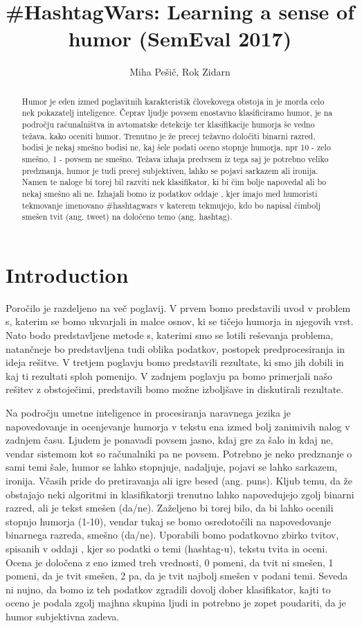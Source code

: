 \documentclass[a4paper]{article}
\title{\#HashtagWars: Learning a sense of humor (SemEval 2017)}
\author{Miha Pešič, Rok Zidarn}
\begin{document}
\maketitle

\begin{abstract}
Humor je eden izmed poglavitnih karakteristik človekovega obstoja in je morda celo nek pokazatelj inteligence. Čeprav ljudje povsem enostavno klasificiramo humor, je na področju računalništva in avtomatske detekcije ter klasifikacije humorja še vedno težava, kako oceniti humor. Trenutno je že precej težavno določiti binarni razred, bodisi je nekaj smešno bodisi ne, kaj šele podati oceno stopnje humorja, npr 10 - zelo smešno, 1 - povsem ne smešno. Težava izhaja predvsem iz tega saj je potrebno veliko predznanja, humor je tudi precej subjektiven, lahko se pojavi sarkazem ali ironija. Namen te naloge bi torej bil razviti nek klasifikator, ki bi čim bolje napovedal ali bo nekaj smešno ali ne. Izhajali bomo iz podatkov oddaje \@midnight, kjer imajo med humoristi tekmovanje imenovano \#hashtagwars v katerem tekmujejo, kdo bo napisal čimbolj smešen tvit (ang. tweet) na določeno temo (ang. hashtag).
\end{abstract}

\section{Introduction}

Poročilo je razdeljeno na več poglavij. V prvem bomo predstavili uvod v problem s, katerim se bomo ukvarjali in malce osnov, ki se tičejo humorja in njegovih vrst. Nato bodo predstavljene metode s, katerimi smo se lotili reševanja problema, natančneje bo predstavljena tudi oblika podatkov, postopek predprocesiranja in ideja rešitve. V tretjem poglavju bomo predstavili rezultate, ki smo jih dobili in kaj ti rezultati sploh pomenijo. V zadnjem poglavju pa bomo primerjali našo rešitev z obstoječimi, predstavili bomo možne izboljšave in diskutirali rezultate.

Na področju umetne inteligence in procesiranja naravnega jezika je napovedovanje in ocenjevanje humorja v tekstu ena izmed bolj zanimivih nalog v zadnjem času. Ljudem je ponavadi povsem jasno, kdaj gre za šalo in kdaj ne, vendar sistemom kot so računalniki pa ne povsem. Potrebno je neko predznanje o sami temi šale, humor se lahko stopnjuje, nadaljuje, pojavi se lahko sarkazem, ironija. Včasih pride do pretiravanja ali igre besed (ang. puns). Kljub temu, da že obstajajo neki algoritmi in klasifikatorji trenutno lahko napovedujejo zgolj binarni razred, ali je tekst smešen (da/ne). Zaželjeno bi torej bilo, da bi lahko ocenili stopnjo humorja (1-10), vendar tukaj se bomo osredotočili na napovedovanje binarnega razreda, smešno (da/ne). Uporabili bomo podatkovno zbirko tvitov, spisanih v oddaji \@midnight, kjer so podatki o temi (hashtag-u), tekstu tvita in oceni. Ocena je določena z eno izmed treh vrednosti, 0 pomeni, da tvit ni smešen, 1 pomeni, da je tvit smešen, 2 pa, da je tvit najbolj smešen v podani temi. Seveda ni nujno, da bomo iz teh podatkov zgradili dovolj dober klasifikator, kajti to oceno je podala zgolj majhna skupina ljudi in potrebno je zopet poudariti, da je humor subjektivna zadeva.
\end{document}

